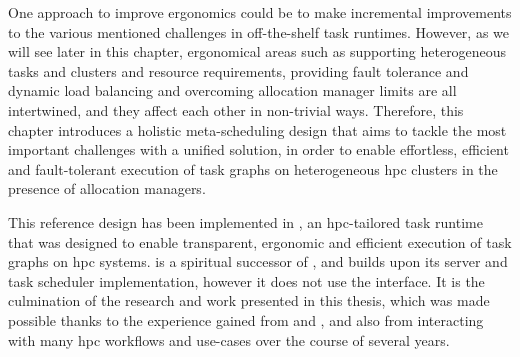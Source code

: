 One approach to improve ergonomics could be to make incremental improvements to the various
mentioned challenges in off-the-shelf task runtimes. However, as we will see later in this chapter,
ergonomical areas such as supporting heterogeneous tasks and clusters and resource requirements,
providing fault tolerance and dynamic load balancing and overcoming allocation manager limits are
all intertwined, and they affect each other in non-trivial ways. Therefore, this chapter introduces
a holistic meta-scheduling design that aims to tackle the most important challenges with a unified
solution, in order to enable effortless, efficient and fault-tolerant execution of task graphs on
heterogeneous \gls{hpc} clusters in the presence of allocation managers.

This reference design has been implemented in \hyperqueue{}, an
\gls{hpc}-tailored task runtime that was designed to enable transparent, ergonomic and
efficient execution of task graphs on \gls{hpc} systems. \hyperqueue{} is a
spiritual successor of \rsds{}, and builds upon its server and task scheduler
implementation, however it does not use the \dask{} interface. It is the culmination
of the research and work presented in this thesis, which was made possible thanks to the experience
gained from \estee{} and \rsds{}, and also from interacting with many
\gls{hpc} workflows and use-cases over the course of several years.





